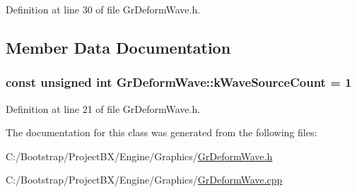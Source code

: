 Definition at line 30 of file GrDeformWave.h.

\subsection{Member Data Documentation}
\hypertarget{class_gr_deform_wave_aa0c4ae9eb424f303e5e4437ed721914}{
\subsubsection[{kWaveSourceCount}]{\setlength{\rightskip}{0pt plus 5cm}const unsigned int {\bf GrDeformWave::kWaveSourceCount} = 1}}
\label{class_gr_deform_wave_aa0c4ae9eb424f303e5e4437ed721914}




Definition at line 21 of file GrDeformWave.h.

The documentation for this class was generated from the following files:\begin{CompactItemize}
\item 
C:/Bootstrap/ProjectBX/Engine/Graphics/\hyperlink{_gr_deform_wave_8h}{GrDeformWave.h}\item 
C:/Bootstrap/ProjectBX/Engine/Graphics/\hyperlink{_gr_deform_wave_8cpp}{GrDeformWave.cpp}\end{CompactItemize}
